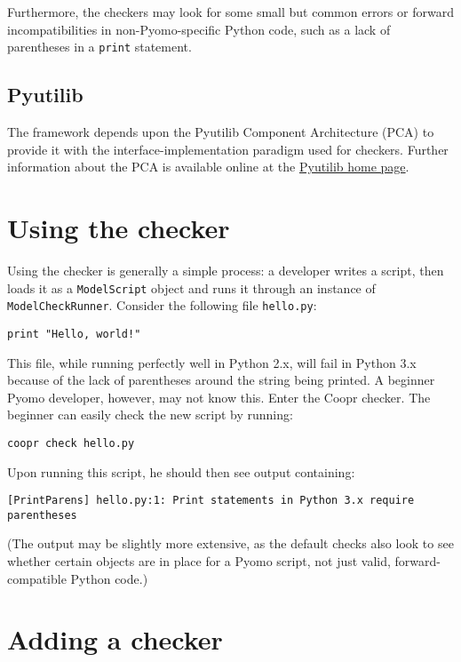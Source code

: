 \documentclass{article}
\begin{document}
Furthermore, the checkers may look for some small but common errors or forward incompatibilities in non-Pyomo-specific Python code, such as a lack of parentheses in a \verb!print! statement.

\subsection*{Pyutilib}
The framework depends upon the Pyutilib Component Architecture (PCA) to provide it with the interface-implementation paradigm used for checkers. Further information about the PCA is available online at the \href{https://software.sandia.gov/trac/pyutilib}{Pyutilib home page}.

\section*{Using the checker}
Using the checker is generally a simple process: a developer writes a script, then loads it as a \verb!ModelScript! object and runs it through an instance of \verb!ModelCheckRunner!. Consider the following file \verb!hello.py!:

\begin{verbatim}
print "Hello, world!"
\end{verbatim}

This file, while running perfectly well in Python 2.x, will fail in Python 3.x because of the lack of parentheses around the string being printed. A beginner Pyomo developer, however, may not know this. Enter the Coopr checker. The beginner can easily check the new script by running:

\begin{verbatim}
coopr check hello.py
\end{verbatim}

Upon running this script, he should then see output containing:

\begin{verbatim}
[PrintParens] hello.py:1: Print statements in Python 3.x require parentheses
\end{verbatim}

\noindent (The output may be slightly more extensive, as the default checks also look to see whether certain objects are in place for a Pyomo script, not just valid, forward-compatible Python code.)

\section*{Adding a checker}
\end{document}

